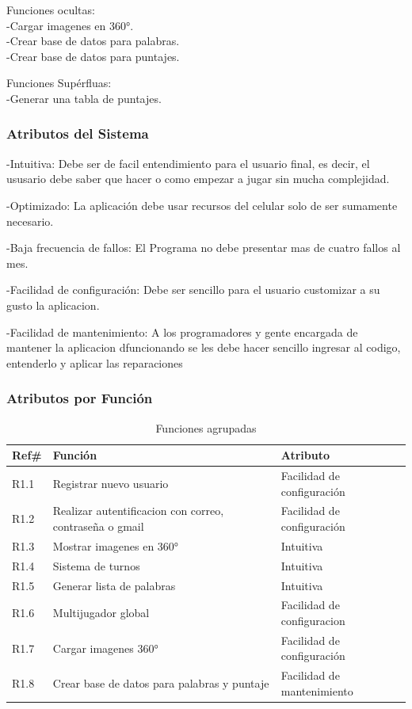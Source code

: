Funciones ocultas:
\\	-Cargar imagenes en 360°.
\\	-Crear base de datos para palabras.
\\	-Crear base de datos para puntajes.


Funciones Supérfluas:
\\	-Generar una tabla de puntajes.
\subsubsection{Atributos del Sistema}
-Intuitiva: Debe ser de facil entendimiento para el usuario final, es decir, el ususario debe saber que hacer o como empezar a jugar sin mucha complejidad.


-Optimizado: La aplicación debe usar recursos del celular solo de ser sumamente necesario.


-Baja frecuencia de fallos: El Programa no debe presentar mas de cuatro fallos al mes.


-Facilidad de configuración: Debe ser sencillo para el usuario customizar a su gusto la aplicacion.


-Facilidad de mantenimiento: A los programadores y gente encargada de mantener la aplicacion dfuncionando se les debe hacer sencillo ingresar al codigo, entenderlo y aplicar las reparaciones
\subsubsection{Atributos por Función}
\begin{table}[H]
    \begin{center}
        \begin{tabular}{| l | m{6cm} | m{6cm} |}        
        	\hline 
        	Ref\# & Función & Atributo\\
        	\hline
        	R1.1 & Registrar nuevo usuario & Facilidad de configuración\\
        	\hline
        	R1.2 & Realizar autentificacion con correo, contraseña o gmail & Facilidad de configuración\\
        	\hline
        	R1.3 & Mostrar imagenes en 360° & Intuitiva\\
        	\hline
        	R1.4 & Sistema de turnos & Intuitiva\\
        	\hline
        	R1.5 & Generar lista de palabras & Intuitiva\\
        	\hline
        	R1.6 & Multijugador global & Facilidad de configuracion\\
        	\hline
        	R1.7 & Cargar imagenes 360° & Facilidad de configuración\\
        	\hline
        	R1.8 & Crear base de datos para palabras y puntaje & Facilidad de mantenimiento\\
        	\hline
        \end{tabular}
    \caption{Funciones agrupadas}
    \end{center}
\end{table}
\newpage
